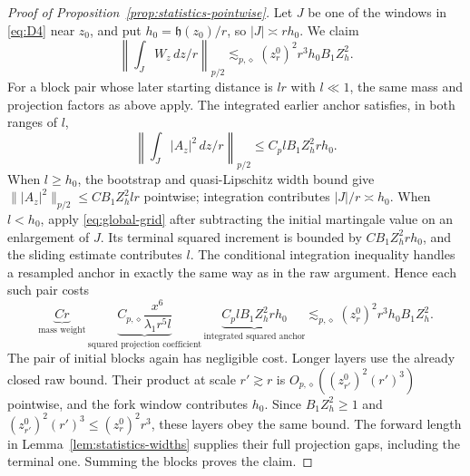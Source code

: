\begin{proof}[Proof of Proposition~\ref{prop:statistics-pointwise}]
Let $J$ be one of the windows in \eqref{eq:D4} near $z_0$, and put
$h_0=\mathfrak h(z_0)/r$, so $|J|\asymp rh_0$. We claim
\[
 \left\|\int_J W_z\,dz/r\right\|_{p/2}
 \lesssim_{p,\diamond}(z_r^0)^2r^3h_0B_1Z_h^2.
\]
For a block pair whose later starting distance is $lr$ with
$l\ll1$, the same mass and projection factors as above apply. The
integrated earlier anchor satisfies, in both ranges of $l$,
\[
 \left\|\int_J|A_z|^2\,dz/r\right\|_{p/2}
 \le C_p lB_1Z_h^2rh_0.
\]
When $l\ge h_0$, the bootstrap and quasi-Lipschitz width bound give
$\||A_z|^2\|_{p/2}\le CB_1Z_h^2lr$ pointwise; integration contributes
$|J|/r\asymp h_0$. When $l<h_0$, apply
\eqref{eq:global-grid} after subtracting the initial martingale value
on an enlargement of $J$. Its terminal squared increment is bounded
by $CB_1Z_h^2rh_0$, and the sliding estimate contributes $l$.
The conditional integration inequality handles a resampled anchor in
exactly the same way as in the raw argument. Hence each such pair costs
\[
 \underbrace{Cr}_{\text{mass weight}}\,
 \underbrace{C_{p,\diamond}\frac{x^6}{\lambda_1r^5l}}
             _{\text{squared projection coefficient}}\,
 \underbrace{C_p lB_1Z_h^2rh_0}_{\text{integrated squared anchor}}
 \lesssim_{p,\diamond}(z_r^0)^2r^3h_0B_1Z_h^2.
\]
The pair of initial blocks again has negligible cost. Longer layers
use the already closed raw bound. Their product at scale $r'\gtrsim r$
is $O_{p,\diamond}((z_{r'}^0)^2(r')^3)$ pointwise, and the fork
window contributes $h_0$. Since $B_1Z_h^2\ge1$ and
$(z_{r'}^0)^2(r')^3\le(z_r^0)^2r^3$, these layers obey the same
bound. The forward length in Lemma~\ref{lem:statistics-widths} supplies
their full projection gaps, including the terminal one. Summing the
blocks proves the claim.


\end{proof}
